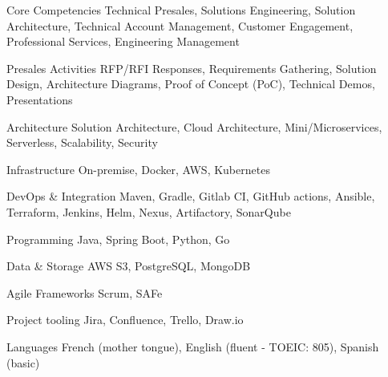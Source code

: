 

\begin{cvskills}

  \cvskill
    {Core Competencies}
    {Technical Presales, Solutions Engineering, Solution Architecture, Technical Account Management, Customer Engagement, Professional Services, Engineering Management}

  \cvskill
    {Presales Activities}
    {RFP/RFI Responses, Requirements Gathering, Solution Design, Architecture Diagrams, Proof of Concept (PoC), Technical Demos, Presentations}

  \cvskill
    {Architecture}
    {Solution Architecture, Cloud Architecture, Mini/Microservices, Serverless, Scalability, Security}

  \cvskill
    {Infrastructure}
    {On-premise, Docker, AWS, Kubernetes}

  \cvskill
    {DevOps \& Integration}
    {Maven, Gradle, Gitlab CI, GitHub actions, Ansible, Terraform, Jenkins, Helm, Nexus, Artifactory, SonarQube}

  \cvskill
    {Programming}
    {Java, Spring Boot, Python, Go}

  \cvskill
    {Data \& Storage}
    {AWS S3, PostgreSQL, MongoDB}

  \cvskill
    {Agile Frameworks}
    {Scrum, SAFe}

  \cvskill
    {Project tooling}
    {Jira, Confluence, Trello, Draw.io}

  \cvskill
    {Languages}
    {French (mother tongue), English (fluent - TOEIC: 805), Spanish (basic)}

\end{cvskills}
